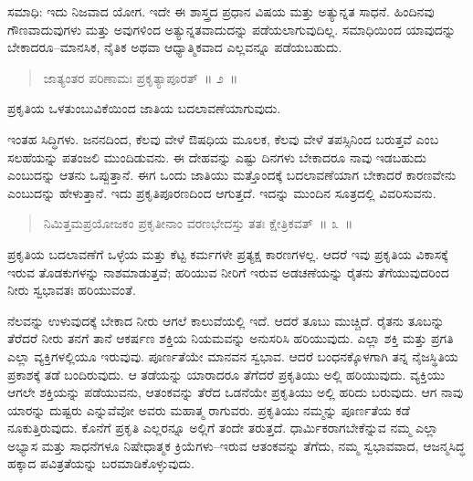 ಸಮಾಧಿ: ಇದು ನಿಜವಾದ ಯೋಗ. ಇದೇ ಈ ಶಾಸ್ತ್ರದ ಪ್ರಧಾನ ವಿಷಯ ಮತ್ತು ಅತ್ಯುನ್ನತ ಸಾಧನೆ. ಹಿಂದಿನವು ಗೌಣವಾದುವುಗಳು ಮತ್ತು ಅವುಗಳಿಂದ ಅತ್ಯುನ್ನತವಾದುದನ್ನು ಪಡೆಯಲಾಗುವುದಿಲ್ಲ. ಸಮಾಧಿಯಿಂದ ಯಾವುದನ್ನು ಬೇಕಾದರೂ–ಮಾನಸಿಕ, ನೈತಿಕ ಅಥವಾ ಆಧ್ಯಾತ್ಮಿಕವಾದ ಎಲ್ಲವನ್ನೂ ಪಡೆಯಬಹುದು. 

\vspace{-0.3cm}

\begin{verse}
ಜಾತ್ಯಂತರ ಪರಿಣಾಮಃ ಪ್ರಕೃತ್ಯಾಪೂರತ್​~॥ ೨~॥
\end{verse}

\vspace{-0.3cm}

ಪ್ರಕೃತಿಯ ಒಳತುಂಬುವಿಕೆಯಿಂದ ಜಾತಿಯ ಬದಲಾವಣೆಯಾಗುವುದು. 

ಇಂತಹ ಸಿದ್ಧಿಗಳು. ಜನನದಿಂದ, ಕೆಲವು ವೇಳೆ ಔಷಧಿಯ ಮೂಲಕ, ಕೆಲವು ವೇಳೆ ತಪಸ್ಸಿನಿಂದ ಬರುತ್ತವೆ ಎಂಬ ಸಲಹೆಯನ್ನು ಪತಂಜಲಿ ಮುಂದಿಡುವನು. ಈ ದೇಹವನ್ನು ಎಷ್ಟು ದಿನಗಳು ಬೇಕಾದರೂ ನಾವು ಇಡಬಹುದು ಎಂಬುದನ್ನು ಆತನು ಒಪ್ಪುತ್ತಾನೆ. ಈಗ ಒಂದು ಜಾತಿಯು ಮತ್ತೊಂದಕ್ಕೆ ಬದಲಾವಣೆಯಾಗ ಬೇಕಾದರೆ ಕಾರಣವೇನು ಎಂಬುದನ್ನು ಹೇಳುತ್ತಾನೆ. ಇದು ಪ್ರಕೃತಿಪೂರಣದಿಂದ ಆಗುತ್ತದೆ. ಇದನ್ನು ಮುಂದಿನ ಸೂತ್ರದಲ್ಲಿ ವಿವರಿಸುವನು. 

\vspace{-0.3cm}

\begin{verse}
ನಿಮಿತ್ತಮಪ್ರಯೋಜಕಂ ಪ್ರಕೃತೀನಾಂ ವರಣಭೇದಸ್ತು ತತಃ ಕ್ಷೇತ್ರಿಕವತ್​~॥ ೩~॥
\end{verse}

\vspace{-0.3cm}

ಪ್ರಕೃತಿಯ ಬದಲಾವಣೆಗೆ ಒಳ್ಳೆಯ ಮತ್ತು ಕೆಟ್ಟ ಕರ್ಮಗಳೇ ಪ್ರತ್ಯಕ್ಷ ಕಾರಣಗಳಲ್ಲ. ಆದರೆ ಇವು ಪ್ರಕೃತಿಯ ವಿಕಾಸಕ್ಕೆ ಇರುವ ತೊಡಕುಗಳನ್ನು ನಾಶಮಾಡುತ್ತವೆ; ಹರಿಯುವ ನೀರಿಗೆ ಇರುವ ಅಡಚಣೆಯನ್ನು ರೈತನು ತೆಗೆಯುವುದರಿಂದ ನೀರು ಸ್ವಭಾವತಃ ಹರಿಯುವಂತೆ. 

ನೆಲವನ್ನು ಉಳುವುದಕ್ಕೆ ಬೇಕಾದ ನೀರು ಆಗಲೆ ಕಾಲುವೆಯಲ್ಲಿ ಇದೆ. ಆದರೆ ತೂಬು ಮುಚ್ಚಿದೆ. ರೈತನು ತೂಬನ್ನು ತೆರೆದರೆ ನೀರು ತನಗೆ ತಾನೆ ಆಕರ್ಷಣ ಶಕ್ತಿಯ ನಿಯಮವನ್ನು ಅನುಸರಿಸಿ ಹರಿಯುವುದು. ಎಲ್ಲಾ ಶಕ್ತಿ ಮತ್ತು ಪ್ರಗತಿ ಎಲ್ಲಾ ವ್ಯಕ್ತಿಗಳಲ್ಲಿಯೂ ಇರುವುವು. ಪೂರ್ಣತೆಯೇ ಮಾನವನ ಸ್ವಭಾವ. ಆದರೆ ಬಂಧನಕ್ಕೊಳಗಾಗಿ ತನ್ನ ನೈಜಸ್ಥಿತಿಯ ಪ್ರಕಾಶಕ್ಕೆ ತಡೆ ಬಂದಿರುವುದು. ಆ ತಡೆಯನ್ನು ಯಾರಾದರೂ ತೆಗೆದರೆ ಪ್ರಕೃತಿಯು ಅಲ್ಲಿ ಹರಿಯುವುದು. ವ್ಯಕ್ತಿಯು ಆಗಲೇ ಶಕ್ತಿಯನ್ನು ಪಡೆಯುವನು, ಆತಂಕವನ್ನು ತೆರೆದ ಒಡನೆಯೇ ಪ್ರಕೃತಿಯು ಅಲ್ಲಿ ಹರಿದು ಬರುವುದು. ಆಗ ನಾವು ಯಾರನ್ನು ದುಷ್ಟರು ಎನ್ನುವೆವೋ ಅವರು ಮಹಾತ್ಮ ರಾಗುವರು. ಪ್ರಕೃತಿಯು ನಮ್ಮನ್ನು ಪೂರ್ಣತೆಯ ಕಡೆ ನೂಕುತ್ತಿರುವುದು. ಕೊನೆಗೆ ಪ್ರಕೃತಿ ಎಲ್ಲರನ್ನೂ ಅಲ್ಲಿಗೆ ತಂದೇ ತರುತ್ತದೆ. ಧಾರ್ಮಿಕರಾಗಬೇಕೆನ್ನುವ ನಮ್ಮ ಎಲ್ಲಾ ಅಭ್ಯಾಸ ಮತ್ತು ಸಾಧನೆಗಳೂ ನಿಷೇಧಾತ್ಮಕ ಕ್ರಿಯೆಗಳು–ಇರುವ ಆತಂಕವನ್ನು ತೆಗೆದು, ನಮ್ಮ ಸ್ವಭಾವವಾದ, ಆಜನ್ಮಸಿದ್ಧ ಹಕ್ಕಾದ ಪವಿತ್ರತೆಯನ್ನು ಬರಮಾಡಿಕೊಳ್ಳುವುದು. 

